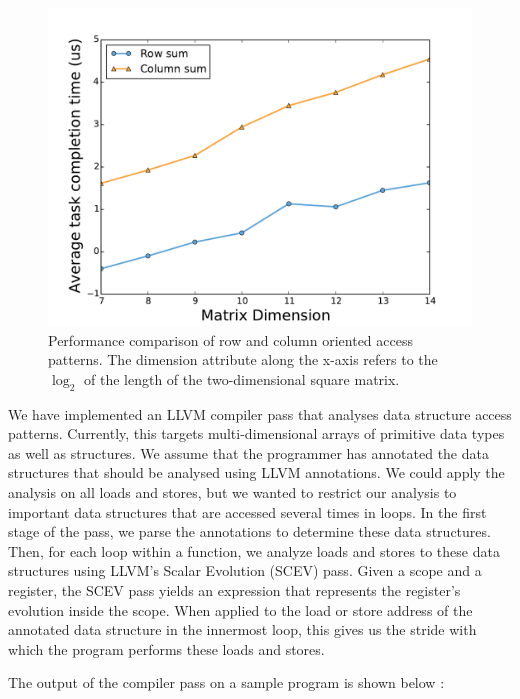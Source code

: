 \documentclass[letterpaper]{article}
\begin{document}
\begin{figure}[ht]
	\centering
	\includegraphics[scale=0.35]{rowmajor}
	\caption{Performance comparison of row and column oriented access patterns.
	The dimension attribute along the x-axis refers to the $\log_2$ of the length of the two-dimensional square matrix. }
	\label{fig:perf}
\end{figure}

We have implemented an LLVM compiler pass that analyses data structure access patterns.
Currently, this targets multi-dimensional arrays of primitive data types as well as structures.
We assume that the programmer has annotated the data structures that should be
analysed using LLVM annotations.
We could apply the analysis on all loads and stores, but we wanted to restrict our
analysis to important data structures that are accessed several times in loops.
In the first stage of the pass, we parse the annotations to determine these data structures.
Then, for each loop within a function, we analyze loads and stores to these
data structures using LLVM's Scalar Evolution (SCEV) pass. Given a scope and a
register, the SCEV pass yields an expression that represents the register's
evolution inside the scope. When applied to the load or store address of the
annotated data structure in the innermost loop, this gives us the stride
with which the program performs these loads and stores.

The output of the compiler pass on a sample program is shown below :
\end{document}
